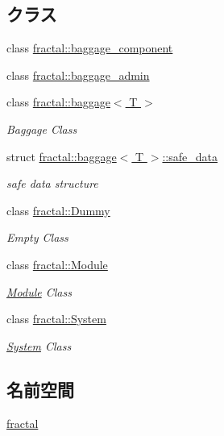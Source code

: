 \subsection*{クラス}
\begin{DoxyCompactItemize}
\item 
class \hyperlink{classfractal_1_1baggage__component}{fractal\+::baggage\+\_\+component}
\item 
class \hyperlink{classfractal_1_1baggage__admin}{fractal\+::baggage\+\_\+admin}
\item 
class \hyperlink{classfractal_1_1baggage}{fractal\+::baggage$<$ T $>$}
\begin{DoxyCompactList}\small\item\em Baggage Class \end{DoxyCompactList}\item 
struct \hyperlink{structfractal_1_1baggage_1_1safe__data}{fractal\+::baggage$<$ T $>$\+::safe\+\_\+data}
\begin{DoxyCompactList}\small\item\em safe data structure \end{DoxyCompactList}\item 
class \hyperlink{classfractal_1_1Dummy}{fractal\+::\+Dummy}
\begin{DoxyCompactList}\small\item\em Empty Class \end{DoxyCompactList}\item 
class \hyperlink{classfractal_1_1Module}{fractal\+::\+Module}
\begin{DoxyCompactList}\small\item\em \hyperlink{classfractal_1_1Module}{Module} Class \end{DoxyCompactList}\item 
class \hyperlink{classfractal_1_1System}{fractal\+::\+System}
\begin{DoxyCompactList}\small\item\em \hyperlink{classfractal_1_1System}{System} Class \end{DoxyCompactList}\end{DoxyCompactItemize}
\subsection*{名前空間}
\begin{DoxyCompactItemize}
\item 
 \hyperlink{namespacefractal}{fractal}
\end{DoxyCompactItemize}
